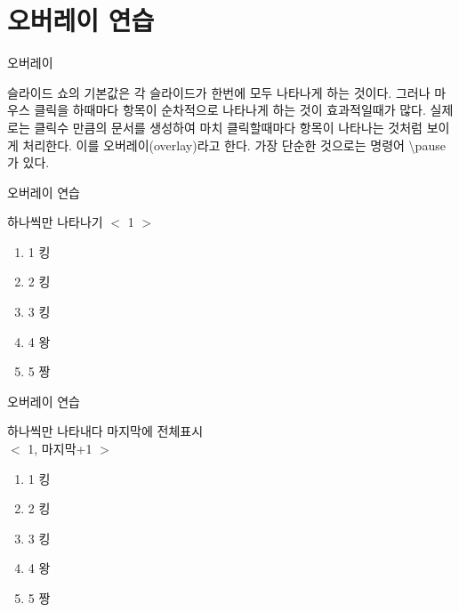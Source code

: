 \documentclass[10pt,blue,xcolor=pdftex,dvipsnames,table,handout]{beamer}
\begin{document}
		\section{오버레이 연습} 

		\begin{frame}[plain]
		\centering
		\end{frame}


		\begin{frame}[t]{오버레이}

		슬라이드 쇼의 기본값은 각 슬라이드가 한번에 모두 나타나게 하는 것이다.
		그러나 마우스 클릭을 하때마다 항목이 순차적으로 나타나게 하는 것이 효과적일때가 많다.
		실제로는 클릭수 만큼의 문서를 생성하여 마치 클릭할때마다 항목이 나타나는 것처럼 보이게 처리한다. 
		이를 오버레이(overlay)라고 한다. 가장 단순한 것으로는 명령어 \textbackslash pause가 있다.


		\end{frame}

		\begin{frame}[t]{오버레이 연습}

			\begin{block} {하나씩만 나타나기 $<$ 1 $>$ }
			\begin{enumerate}
			\item <1> 1 킹
			\item <2> 2 킹
			\item <3> 3 킹
			\item <4> 4 왕
			\item <5> 5 짱
			\end{enumerate}
			\end{block} 

		\end{frame}

		\begin{frame}[t]{오버레이 연습}

			\begin{block} {하나씩만 나타내다 마지막에 전체표시\\
						$<$ 1, 마지막+1 $>$ }
			\begin{enumerate}
			\item <1,6> 1 킹
			\item <2,6> 2 킹
			\item <3,6> 3 킹
			\item <4,6> 4 왕
			\item <5,6> 5 짱
			\end{enumerate}
			\end{block} 

		\end{frame}
\end{document}
